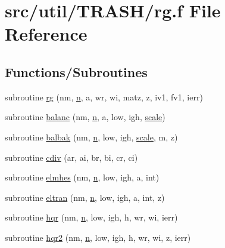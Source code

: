 \hypertarget{_t_r_a_s_h_2rg_8f}{\section{src/util/\-T\-R\-A\-S\-H/rg.f File Reference}
\label{_t_r_a_s_h_2rg_8f}
}
\subsection*{Functions/\-Subroutines}
\begin{DoxyCompactItemize}
\item 
subroutine \hyperlink{_t_r_a_s_h_2rg_8f_a8942cae6319671cdf7ba91a0ba689cc9}{rg} (nm, \hyperlink{time_8com_a24bdc4a048267ff98f6f8137112e6f2f}{n}, a, wr, wi, matz, z, iv1, fv1, ierr)
\item 
subroutine \hyperlink{_t_r_a_s_h_2rg_8f_aba120d9bbf60938700210c16106cdf2f}{balanc} (nm, \hyperlink{time_8com_a24bdc4a048267ff98f6f8137112e6f2f}{n}, a, low, igh, \hyperlink{streamplasma_8com_a9616e932993fe637ff56a4e7e73a4edd}{scale})
\item 
subroutine \hyperlink{_t_r_a_s_h_2rg_8f_a88904eee0d26b87d49e5ff3f8f4fa6d1}{balbak} (nm, \hyperlink{time_8com_a24bdc4a048267ff98f6f8137112e6f2f}{n}, low, igh, \hyperlink{streamplasma_8com_a9616e932993fe637ff56a4e7e73a4edd}{scale}, m, z)
\item 
subroutine \hyperlink{_t_r_a_s_h_2rg_8f_a0a5595f19cd351dc283c4be4ffd1096e}{cdiv} (ar, ai, br, bi, cr, ci)
\item 
subroutine \hyperlink{_t_r_a_s_h_2rg_8f_a721848a66951298977535e93e3ad353b}{elmhes} (nm, \hyperlink{time_8com_a24bdc4a048267ff98f6f8137112e6f2f}{n}, low, igh, a, int)
\item 
subroutine \hyperlink{_t_r_a_s_h_2rg_8f_a3937bdfec6d2fc2a7c998388d12eab4f}{eltran} (nm, \hyperlink{time_8com_a24bdc4a048267ff98f6f8137112e6f2f}{n}, low, igh, a, int, z)
\item 
subroutine \hyperlink{_t_r_a_s_h_2rg_8f_a629b9c03a461254bd4d5b1c36efbc2dd}{hqr} (nm, \hyperlink{time_8com_a24bdc4a048267ff98f6f8137112e6f2f}{n}, low, igh, h, wr, wi, ierr)
\item 
subroutine \hyperlink{_t_r_a_s_h_2rg_8f_ae4440094f77fe6b409524b1c869bedb9}{hqr2} (nm, \hyperlink{time_8com_a24bdc4a048267ff98f6f8137112e6f2f}{n}, low, igh, h, wr, wi, z, ierr)
\end{DoxyCompactItemize}


